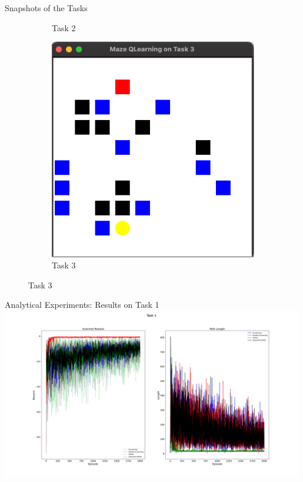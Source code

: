 \documentclass{beamer}
\begin{document}
\begin{frame}{Snapshots of the Tasks}
\begin{figure}[t]
\begin{subfigure}{0.315\textwidth}
        \caption{Task 2}
        \label{Fig_Task2}
    \end{subfigure}
    \hfill
    \begin{subfigure}{0.315\textwidth}
        \centering
        \includegraphics[width=\textwidth]{figs/task3.png}
        \caption{Task 3}
        \label{Fig_Task3}
    \end{subfigure}
    \label{Fig_Tasks}
\end{figure}
\end{frame}

\begin{frame}{Analytical Experiments: Results on Task 1}
  \centering
  \includegraphics[width=0.99\textwidth]{figs/Task_1.png}
\end{frame}
\end{document}
